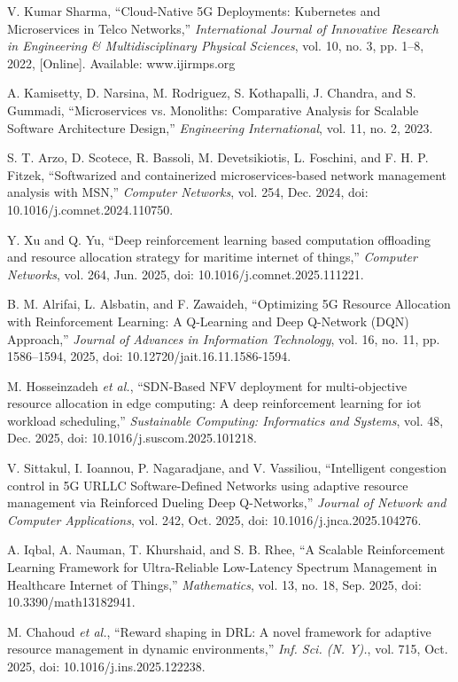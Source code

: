  V. Kumar Sharma, ``Cloud-Native 5G Deployments: Kubernetes and Microservices in Telco Networks,'' \emph{International Journal of Innovative Research in Engineering \& Multidisciplinary Physical Sciences}, vol. 10, no. 3, pp. 1--8, 2022, {[}Online{]}. Available: www.ijirmps.org

 A. Kamisetty, D. Narsina, M. Rodriguez, S. Kothapalli, J. Chandra, and S. Gummadi, ``Microservices vs. Monoliths: Comparative Analysis for Scalable Software Architecture Design,'' \emph{Engineering International}, vol. 11, no. 2, 2023.

 S. T. Arzo, D. Scotece, R. Bassoli, M. Devetsikiotis, L. Foschini, and F. H. P. Fitzek, ``Softwarized and containerized microservices-based network management analysis with MSN,'' \emph{Computer Networks}, vol. 254, Dec. 2024, doi: 10.1016/j.comnet.2024.110750.

 Y. Xu and Q. Yu, ``Deep reinforcement learning based computation offloading and resource allocation strategy for maritime internet of things,'' \emph{Computer Networks}, vol. 264, Jun. 2025, doi: 10.1016/j.comnet.2025.111221.

 B. M. Alrifai, L. Alsbatin, and F. Zawaideh, ``Optimizing 5G Resource Allocation with Reinforcement Learning: A Q-Learning and Deep Q-Network (DQN) Approach,'' \emph{Journal of Advances in Information Technology}, vol. 16, no. 11, pp. 1586--1594, 2025, doi: 10.12720/jait.16.11.1586-1594.

 M. Hosseinzadeh \emph{et al.}, ``SDN-Based NFV deployment for multi-objective resource allocation in edge computing: A deep reinforcement learning for iot workload scheduling,'' \emph{Sustainable Computing: Informatics and Systems}, vol. 48, Dec. 2025, doi: 10.1016/j.suscom.2025.101218.

 V. Sittakul, I. Ioannou, P. Nagaradjane, and V. Vassiliou, ``Intelligent congestion control in 5G URLLC Software-Defined Networks using adaptive resource management via Reinforced Dueling Deep Q-Networks,'' \emph{Journal of Network and Computer Applications}, vol. 242, Oct. 2025, doi: 10.1016/j.jnca.2025.104276.

 A. Iqbal, A. Nauman, T. Khurshaid, and S. B. Rhee, ``A Scalable Reinforcement Learning Framework for Ultra-Reliable Low-Latency Spectrum Management in Healthcare Internet of Things,'' \emph{Mathematics}, vol. 13, no. 18, Sep. 2025, doi: 10.3390/math13182941.

 M. Chahoud \emph{et al.}, ``Reward shaping in DRL: A novel framework for adaptive resource management in dynamic environments,'' \emph{Inf. Sci. (N. Y).}, vol. 715, Oct. 2025, doi: 10.1016/j.ins.2025.122238.


